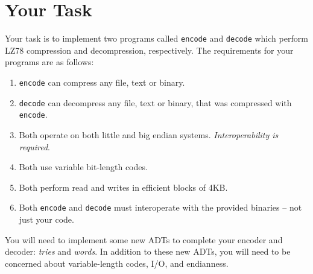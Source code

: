 \section{Your Task}\label{sec:task}

Your task is to implement two programs called \texttt{encode} and
\texttt{decode} which perform LZ78 compression and decompression, respectively.
The requirements for your programs are as follows:

\begin{enumerate}
    \item \texttt{encode} can compress any file, text or binary.
    \item \texttt{decode} can decompress any file, text or binary, that was
        compressed with \texttt{encode}.
    \item Both operate on both little and big endian systems.
        \emph{Interoperability is required}.
    \item Both use variable bit-length codes.
    \item Both perform read and writes in efficient blocks of 4KB.
    \item Both \texttt{encode} and \texttt{decode} must interoperate
        with the provided binaries -- not just your code.
\end{enumerate}

You will need to implement some new ADTs to complete your encoder and decoder:
\emph{tries} and \emph{words}. In addition to these new ADTs, you will need to
be concerned about variable-length codes, I/O, and endianness.
